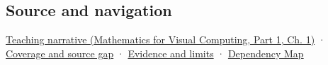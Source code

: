 \subsection{Source and navigation}\label{appendix-2391db8052b1-source-and-navigation}

\hypertarget{appendix-2391db8052b1-source-and-navigation}{}

\href{../02-Mathematics-for-Visual-Computing-P01/main.pdf\#01-foundations-i-ch017-oriented-area-tells-us-which-side-of-the-panel-is-front}{Teaching narrative (Mathematics for Visual Computing, Part 1, Ch. 1)} · \hyperref[appendix-fd090d982a15-phase-6---parts-501-600]{Coverage and source gap} · \hyperref[appendix-a103e7846d21-phase-6---source-analysis-and-verification]{Evidence and limits} · \hyperref[appendix-4ad47bdd269a]{Dependency Map}
